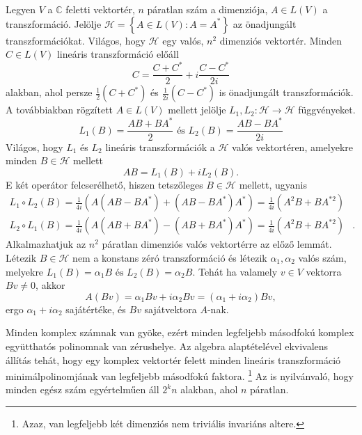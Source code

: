 \documentclass[a4paper, showtrims]{memoir}
\makeatletter
\renewenvironment{proof}[1][\proofname]
    {\par\pushQED{\qed}%
    \normalfont \topsep6\p@\@plus6\p@\relax
    \trivlist
    \item[\hskip\labelsep
        \itshape
    #1\@addpunct{:}]\ignorespaces}
    {\popQED\endtrivlist\@endpefalse}
\theoremstyle{plain}
\theoremstyle{remark}
\theoremstyle{definition}
\makeatother
\begin{document}
\begin{proof}
	Legyen $V$ a $\mathbb{C}$ feletti vektortér, $n$ páratlan szám a dimenziója,
	$A\in L\left( V \right)$ a transzformáció.
	Jelölje $\mathcal{H}=\left\{ A\in L\left( V \right):A=A^* \right\}$
	az önadjungált transzformációkat.
	Világos, hogy $\mathcal{H}$ egy valós, $n^2$ dimenziós vektortér.
	Minden $C\in L\left( V \right)$ lineáris transzformáció előáll
	\[
		C=
		\frac{C+C^*}{2}+
		i\frac{C-C^*}{2i}
	\]
	alakban, ahol persze
	$\frac{1}{2}\left( C+C^* \right)$ és
	$\frac{1}{2i}\left( C-C^* \right)$ is önadjungált transzformációk.
	A továbbiakban rögzített $A\in L\left( V \right)$ mellett jelölje
	$L_1,L_2:\mathcal{H}\to\mathcal{H}$ függvényeket.
	\[
		L_1\left( B \right)=
		\frac{AB+BA^*}{2}
		\text{ és }
		L_2\left( B \right)=
		\frac{AB-BA^*}{2i}
	\]
	Világos, hogy $L_1$ és $L_2$ lineáris transzformációk a $\mathcal{H}$ valós
	vektortéren,
	amelyekre minden $B\in \mathcal{H}$ mellett
	\[
		AB=L_1\left( B \right)+iL_2\left( B \right).
	\]
	E két operátor felcserélhető, hiszen tetszőleges $B\in\mathcal{H}$ mellett, ugyanis
	\begin{eqnarray*}
		L_1\circ L_2\left( B \right)=
		\frac{1}{4i}\left( A\left( AB-BA^* \right)+\left( AB-BA^* \right)A^* \right)=
		\frac{1}{4i}\left( A^2B+BA^{*2} \right)&&\\
		L_2\circ L_1\left( B \right)=
		\frac{1}{4i}\left( A\left( AB+BA^* \right)-\left( AB+BA^* \right)A^* \right)=
		\frac{1}{4i}\left( A^2B+BA^{*2} \right)&.&
	\end{eqnarray*}
	Alkalmazhatjuk az $n^2$ páratlan dimenziós valós vektortérre az előző lemmát.
	Létezik $B\in\mathcal{H}$ nem a konstans zéró transzformáció és
	létezik $\alpha_1,\alpha_2$ valós szám,
	melyekre
	\(
	L_1\left( B \right)=\alpha_1B
	\text{ és }
	L_2\left( B \right)=\alpha_2B.
	\)
	Tehát ha valamely $v\in V$ vektorra $Bv\neq 0$,
	akkor
	\[
		A\left( Bv \right)=
		\alpha_1Bv+
		i\alpha_2Bv=
		\left(\alpha_1+i\alpha_2\right)Bv,
	\]
	ergo $\alpha_1+i\alpha_2$ sajátértéke, és $Bv$ sajátvektora $A$-nak.
\end{proof}

Minden komplex számnak van gyöke, ezért minden legfeljebb másodfokú komplex együtthatós
polinomnak van zérushelye.
Az algebra alaptételével ekvivalens állítás tehát, hogy egy komplex vektortér felett
minden lineáris transzformáció minimálpolinomjának van legfeljebb másodfokú faktora.%
\footnote{Azaz, van legfeljebb két dimenziós nem triviális invariáns altere.}
Az is nyilvánvaló, hogy minden egész szám egyértelműen áll $2^kn$ alakban, ahol $n$ páratlan.
\end{document}
